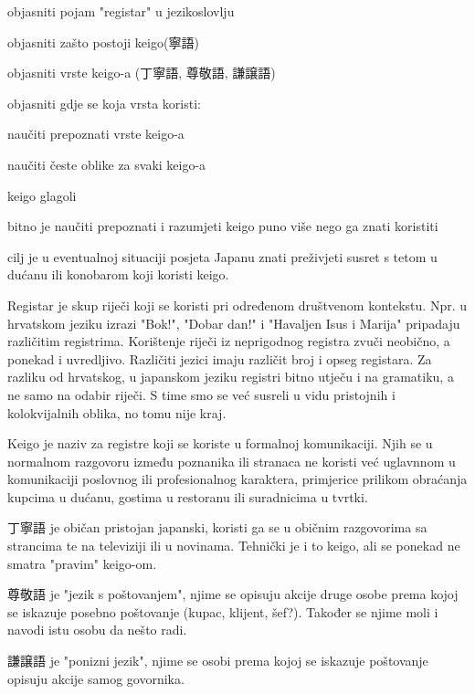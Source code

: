
\author{Ivan Petranović}

	
	
	\begin{hyou}
		\item objasniti pojam "registar" u jezikoslovlju
		\item objasniti zašto postoji keigo(寧語)
		\item objasniti vrste keigo-a (丁寧語, 尊敬語, 謙譲語)
		\item objasniti gdje se koja vrsta koristi:
		\item naučiti prepoznati vrste keigo-a
		\item naučiti česte oblike za svaki keigo-a
		\item keigo glagoli
	\end{hyou}

	
	\begin{hyou}
		\item bitno je naučiti prepoznati i razumjeti keigo puno više nego ga znati koristiti
		\item cilj je u eventualnoj situaciji posjeta Japanu znati preživjeti susret s tetom u dućanu ili konobarom koji koristi keigo.
	\end{hyou}

	
	Registar je skup riječi koji se koristi pri određenom društvenom kontekstu. Npr. u hrvatskom jeziku izrazi "Bok!", "Dobar dan!" i "Havaljen Isus i Marija" pripadaju različitim registrima. Korištenje riječi iz neprigodnog registra zvuči neobično, a ponekad i uvredljivo. Različiti jezici imaju različit broj i opseg registara. Za razliku od hrvatskog, u japanskom jeziku registri bitno utječu i na gramatiku, a ne samo na odabir riječi. S time smo se već susreli u vidu pristojnih i kolokvijalnih oblika, no tomu nije kraj.
	
	Keigo je naziv za registre koji se koriste u formalnoj komunikaciji. Njih se u normalnom razgovoru između poznanika ili stranaca ne koristi već uglavnnom u komunikaciji poslovnog ili profesionalnog karaktera, primjerice prilikom obraćanja kupcima u dućanu, gostima u restoranu ili suradnicima u tvrtki.
	
	丁寧語 je običan pristojan japanski, koristi ga se u običnim razgovorima sa strancima te na televiziji ili u novinama. Tehnički je i to keigo, ali se ponekad ne smatra "pravim" keigo-om.
	
	尊敬語 je "jezik s poštovanjem", njime se opisuju akcije druge osobe prema kojoj se iskazuje posebno poštovanje (kupac, klijent, šef?). Također se njime moli i navodi istu osobu da nešto radi.
	
	謙譲語 je "ponizni jezik", njime se osobi prema kojoj se iskazuje poštovanje opisuju akcije samog govornika.
